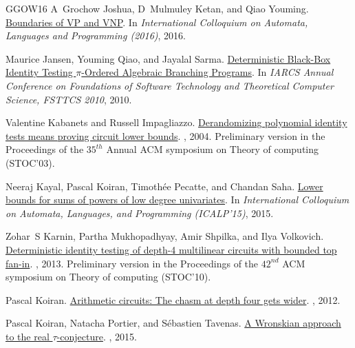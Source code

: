 \documentclass[10pt,a4paper]{article}
\numberwithin{equation}{section}
\begin{document}
\begin{thebibliography}{GGOW16}
A~Grochow Joshua, D~Mulmuley Ketan, and Qiao Youming.
\newblock \href{https://drops.dagstuhl.de/opus/volltexte/2016/6314/}{Boundaries
  of {VP} and {VNP}}.
\newblock In {\em International Colloquium on Automata, Languages and Programming (2016)}, 2016.

Maurice Jansen, Youming Qiao, and Jayalal Sarma.
\newblock
  \href{https://drops.dagstuhl.de/opus/volltexte/2010/2872/pdf/26.pdf}{Deterministic
  Black-Box Identity Testing $\pi$-Ordered Algebraic Branching Programs}.
\newblock In {\em {IARCS} Annual Conference on Foundations of Software
  Technology and Theoretical Computer Science, {FSTTCS} 2010}, 2010.

Valentine Kabanets and Russell Impagliazzo.
\newblock
  \href{https://link.springer.com/article/10.1007/s00037-004-0182-6}{Derandomizing
  polynomial identity tests means proving circuit lower bounds}.
, 2004.
\newblock Preliminary version in the Proceedings of the $35^{th}$ Annual ACM
  symposium on Theory of computing (STOC'03).

Neeraj Kayal, Pascal Koiran, Timoth{\'e}e Pecatte, and Chandan Saha.
\newblock
  \href{https://link.springer.com/chapter/10.1007\%2F978-3-662-47672-7_66}{Lower
  bounds for sums of powers of low degree univariates}.
\newblock In {\em International Colloquium on Automata, Languages, and
  Programming (ICALP'15)}, 2015.

Zohar~S Karnin, Partha Mukhopadhyay, Amir Shpilka, and Ilya Volkovich.
\newblock
  \href{https://epubs.siam.org/doi/abs/10.1137/110824516?af=R}{Deterministic
  identity testing of depth-4 multilinear circuits with bounded top fan-in}.
, 2013.
\newblock Preliminary version in the Proceedings of the $42^{nd}$ ACM symposium
  on Theory of computing (STOC'10).

Pascal Koiran.
\newblock
  \href{https://www.sciencedirect.com/science/article/pii/S0304397512003131}{Arithmetic
  circuits: The chasm at depth four gets wider}.
, 2012.

Pascal Koiran, Natacha Portier, and S{\'e}bastien Tavenas.
\newblock
  \href{https://www.sciencedirect.com/science/article/pii/S0747717114001047}{A
  Wronskian approach to the real $\tau$-conjecture}.
, 2015.


\end{thebibliography}
\end{document}
